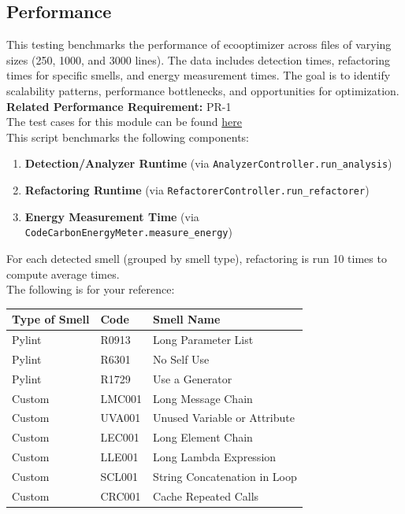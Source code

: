 \documentclass[12pt, titlepage]{article}
\begin{document}
\subsection{Performance}

This testing benchmarks the performance of ecooptimizer across
files of varying sizes (250, 1000, and 3000 lines). The data includes
detection times, refactoring times for specific smells, and energy measurement times.
The goal is to identify scalability patterns, performance bottlenecks, and
opportunities for optimization.\\

\textbf{Related Performance Requirement:} PR-1\\

\noindent The test cases for this module can be found
\href{https://github.com/ssm-lab/capstone--source-code-optimizer/blob/new-poc/tests/benchmarking/benchmark.py}{here}\\

This script benchmarks the following components:

\begin{enumerate}
  \item \textbf{Detection/Analyzer Runtime} (via
    \texttt{AnalyzerController.run\_analysis})
  \item \textbf{Refactoring Runtime} (via
    \texttt{RefactorerController.run\_refactorer})
  \item \textbf{Energy Measurement Time} (via
    \texttt{CodeCarbonEnergyMeter.measure\_energy})
\end{enumerate}

For each detected smell (grouped by smell type), refactoring is run
10 times to compute average times.\\

\noindent The following is for your reference: \\

\begin{tabular}{|l|l|l|}
  \hline
  \textbf{Type of Smell} & \textbf{Code} & \textbf{Smell Name} \\
  \hline
  Pylint & R0913 & Long Parameter List \\
  Pylint & R6301 & No Self Use \\
  Pylint & R1729 & Use a Generator \\
  \hline
  Custom & LMC001 & Long Message Chain \\
  Custom & UVA001 & Unused Variable or Attribute \\
  Custom & LEC001 & Long Element Chain \\
  Custom & LLE001 & Long Lambda Expression \\
  Custom & SCL001 & String Concatenation in Loop \\
  Custom & CRC001 & Cache Repeated Calls \\
  \hline
\end{tabular}
\end{document}
